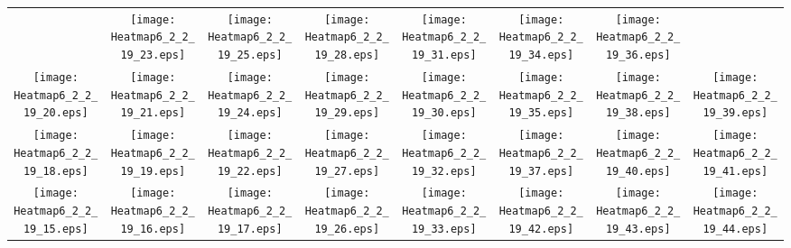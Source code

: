 \documentclass{standalone}
\begin{document}
\renewcommand{\arraystretch}{0}
\setlength{\tabcolsep}{0pt}
\begin{tabular}{ *8{c} }
 & \texttt{[image: Heatmap6\_2\_2\_19\_23.eps]} & \texttt{[image: Heatmap6\_2\_2\_19\_25.eps]} & \texttt{[image: Heatmap6\_2\_2\_19\_28.eps]} & \texttt{[image: Heatmap6\_2\_2\_19\_31.eps]} & \texttt{[image: Heatmap6\_2\_2\_19\_34.eps]} & \texttt{[image: Heatmap6\_2\_2\_19\_36.eps]} &  \\
\texttt{[image: Heatmap6\_2\_2\_19\_20.eps]} & \texttt{[image: Heatmap6\_2\_2\_19\_21.eps]} & \texttt{[image: Heatmap6\_2\_2\_19\_24.eps]} & \texttt{[image: Heatmap6\_2\_2\_19\_29.eps]} & \texttt{[image: Heatmap6\_2\_2\_19\_30.eps]} & \texttt{[image: Heatmap6\_2\_2\_19\_35.eps]} & \texttt{[image: Heatmap6\_2\_2\_19\_38.eps]} & \texttt{[image: Heatmap6\_2\_2\_19\_39.eps]} \\
\texttt{[image: Heatmap6\_2\_2\_19\_18.eps]} & \texttt{[image: Heatmap6\_2\_2\_19\_19.eps]} & \texttt{[image: Heatmap6\_2\_2\_19\_22.eps]} & \texttt{[image: Heatmap6\_2\_2\_19\_27.eps]} & \texttt{[image: Heatmap6\_2\_2\_19\_32.eps]} & \texttt{[image: Heatmap6\_2\_2\_19\_37.eps]} & \texttt{[image: Heatmap6\_2\_2\_19\_40.eps]} & \texttt{[image: Heatmap6\_2\_2\_19\_41.eps]} \\
\texttt{[image: Heatmap6\_2\_2\_19\_15.eps]} & \texttt{[image: Heatmap6\_2\_2\_19\_16.eps]} & \texttt{[image: Heatmap6\_2\_2\_19\_17.eps]} & \texttt{[image: Heatmap6\_2\_2\_19\_26.eps]} & \texttt{[image: Heatmap6\_2\_2\_19\_33.eps]} & \texttt{[image: Heatmap6\_2\_2\_19\_42.eps]} & \texttt{[image: Heatmap6\_2\_2\_19\_43.eps]} & \texttt{[image: Heatmap6\_2\_2\_19\_44.eps]} \\

\end{tabular}
\end{document}
